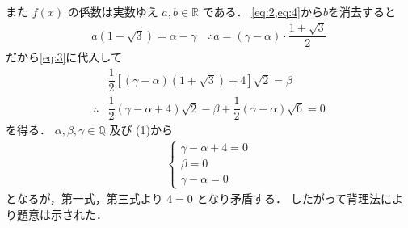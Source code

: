 \documentclass[../../main.tex]{subfiles}
\begin{document}
また $f(x)$ の係数は実数ゆえ $a, b \in \mathbb{R}$ である．
\cref{eq:2,eq:4}から$b$を消去すると
\begin{align}
  a(1 - \sqrt{3}) = \alpha - \gamma
  \quad \therefore
  a = (\gamma - \alpha) \cdot \dfrac{1+\sqrt{3}}{2}
\end{align}
だから\cref{eq:3}に代入して
\begin{align}
  & \dfrac{1}{2} \left[ (\gamma - \alpha)(1 + \sqrt{3}) + 4 \right] \sqrt{2} = \beta \\
  \therefore
  & \dfrac{1}{2}(\gamma - \alpha + 4)\sqrt{2} - \beta + \dfrac{1}{2}(\gamma - \alpha)\sqrt{6} = 0
\end{align}
を得る． $\alpha, \beta, \gamma \in \mathbb{Q}$ 及び (1)から
\begin{align}
  \begin{cases}
    \gamma - \alpha + 4 = 0 \\
    \beta = 0 \\
    \gamma - \alpha = 0
  \end{cases}
\end{align}
となるが，第一式，第三式より $4=0$ となり矛盾する．
したがって背理法により題意は示された．
\end{document}

